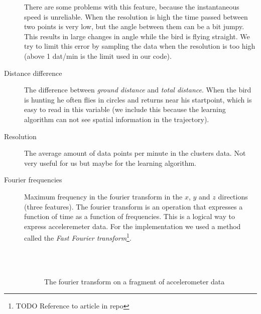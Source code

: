 \begin{description}
  There are some problems with this feature, because the instantaneous speed is unreliable. When the resolution is high the time passed between two points is very low, but the angle between them can be a bit jumpy. This results in large changes in angle while the bird is flying straight. We try to limit this error by sampling the data when the resolution is too high (above 1 dat/min is the limit used in our code).
  \item[Distance difference] The difference between \emph{ground distance} and \emph{total distance}. When the bird is hunting he often flies in circles and returns near his startpoint, which is easy to read in this variable (we include this because the learning algorithm can not see spatial information in the trajectory).
  \item[Resolution] The average amount of data points per minute in the clusters data. Not very useful for us but maybe for the learning algorithm.
  \item[Fourier frequencies] Maximum frequency in the fourier transform in the $x$, $y$ and $z$ directions (three features). The fourier transform is an operation that expresses a function of time as a function of frequencies. This is a logical way to express acceleremeter data. For the implementation we used a method called the \emph{Fast Fourier transform}\footnote{TODO Reference to article in repo}. 

  \begin{figure}[htb!]
    \centering
    \\
    \\
    \caption{The fourier transform on a fragment of accelerometer data}
    \label{fig:fourier}
  \end{figure}


\end{description}
